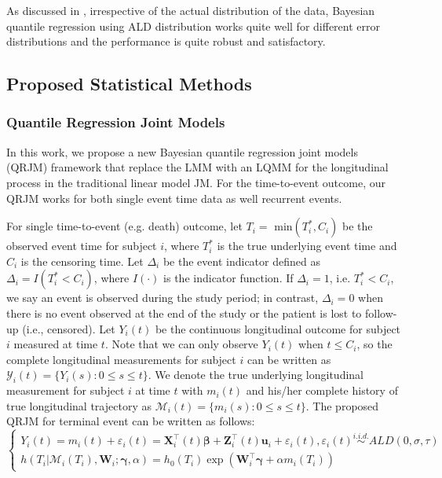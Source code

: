 As discussed in \cite{yu2001bayesian}, irrespective of the actual distribution of the data, Bayesian quantile regression using ALD distribution works quite well for different error distributions and the performance is quite robust and satisfactory.




\subsection{Proposed Statistical Methods}\label{sec:bak_proposed_models}

\subsubsection{Quantile Regression Joint Models}\label{sec:bak_jm_lqmm}
In this work, we propose a new Bayesian quantile regression joint models (QRJM) framework that replace the LMM with an LQMM for the longitudinal process in the traditional linear model JM. For the time-to-event outcome, our QRJM works for both single event time data as well recurrent events.

For single time-to-event (e.g. death) outcome, let $T_i = $ min$(T_i^*, C_i)$ be the observed event time for subject $i$, where $T_i^*$ is the true underlying event time and $C_i$ is the censoring time. Let $\Delta_i$ be the event indicator defined as $\Delta_i = I(T_i^* < C_i)$, where $I(\cdot)$ is the indicator function. If $\Delta_i=1$, i.e. $T_i^* < C_i$, we say an event is observed during the study period; in contrast, $\Delta_i=0$ when there is no event observed at the end of the study or the patient is lost to follow-up (i.e., censored). Let $Y_{i}(t)$ be the continuous longitudinal outcome for subject $i$ measured at time $t$. Note that we can only observe $Y_{i}(t)$ when $t\le C_i$, so the complete longitudinal measurements for subject $i$ can be written as $\mathcal{Y}_{i}(t)=\{Y_{i}(s): 0\le s\le t\}$. We denote the true underlying longitudinal measurement for subject $i$ at time $t$ with $m_{i}(t)$ and his/her complete history of true longitudinal trajectory as $\mathcal{M}_{i}(t)=\{m_{i}(s): 0\le s \le t\}$. The proposed QRJM for terminal event can be written as follows:
\begin{equation*}\label{eqn:joint_LQMM}
\left\{
\begin{array}{l}
Y_{i}(t) = m_{i}(t) + \varepsilon_{i}(t) = {\boldsymbol X}_{i}^{\top}(t)\boldsymbol{\beta} + {\boldsymbol Z}_{i}^{\top}(t){\boldsymbol u}_i + \varepsilon_{i}(t), \varepsilon_{i}(t) \overset{i.i.d.}\sim ALD(0, \sigma, \tau)\\
h(T_i|\mathcal{M}_{i}(T_i), {\boldsymbol W}_i;  \boldsymbol{\gamma}, \alpha) = h_0(T_i)\exp({\boldsymbol W}_i^{\top}\boldsymbol{\gamma} + \alpha m_{i}(T_i))
\end{array}
\right.
\end{equation*}


